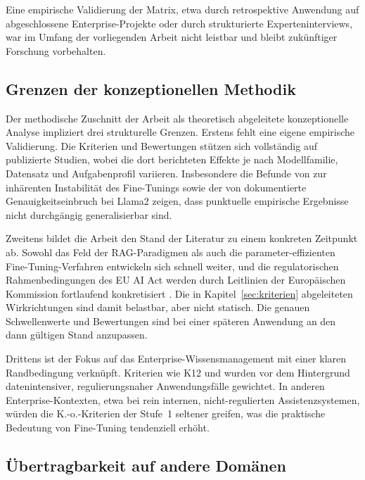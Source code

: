 Eine empirische Validierung der Matrix, etwa durch retrospektive Anwendung auf abgeschlossene Enterprise-Projekte oder durch strukturierte Experteninterviews, war im Umfang der vorliegenden Arbeit nicht leistbar und bleibt zukünftiger Forschung vorbehalten.

\subsection{Grenzen der konzeptionellen Methodik}

Der methodische Zuschnitt der Arbeit als theoretisch abgeleitete konzeptionelle Analyse impliziert drei strukturelle Grenzen. Erstens fehlt eine eigene empirische Validierung. Die Kriterien und Bewertungen stützen sich vollständig auf publizierte Studien, wobei die dort berichteten Effekte je nach Modellfamilie, Datensatz und Aufgabenprofil variieren. Insbesondere die Befunde von \textcite[7]{Ovadia.2024} zur inhärenten Instabilität des Fine-Tunings sowie der von \textcite[26]{Balaguer.2024} dokumentierte Genauigkeitseinbruch bei Llama2 zeigen, dass punktuelle empirische Ergebnisse nicht durchgängig generalisierbar sind.

Zweitens bildet die Arbeit den Stand der Literatur zu einem konkreten Zeitpunkt ab. Sowohl das Feld der RAG-Paradigmen \autocite[6]{Gao.2024} als auch die parameter-effizienten Fine-Tuning-Verfahren entwickeln sich schnell weiter, und die regulatorischen Rahmenbedingungen des EU AI Act werden durch Leitlinien der Europäischen Kommission fortlaufend konkretisiert \autocite[Rn.~61]{EuropeanCommission.2025}. Die in Kapitel~\ref{sec:kriterien} abgeleiteten Wirkrichtungen sind damit belastbar, aber nicht statisch. Die genauen Schwellenwerte und Bewertungen sind bei einer späteren Anwendung an den dann gültigen Stand anzupassen.

Drittens ist der Fokus auf das Enterprise-Wissensmanagement mit einer klaren Randbedingung verknüpft. Kriterien wie K12 und  wurden vor dem Hintergrund datenintensiver, regulierungsnaher Anwendungsfälle gewichtet. In anderen Enterprise-Kontexten, etwa bei rein internen, nicht-regulierten Assistenzsystemen, würden die K.-o.-Kriterien der Stufe~1 seltener greifen, was die praktische Bedeutung von Fine-Tuning tendenziell erhöht.

\subsection{Übertragbarkeit auf andere Domänen}

